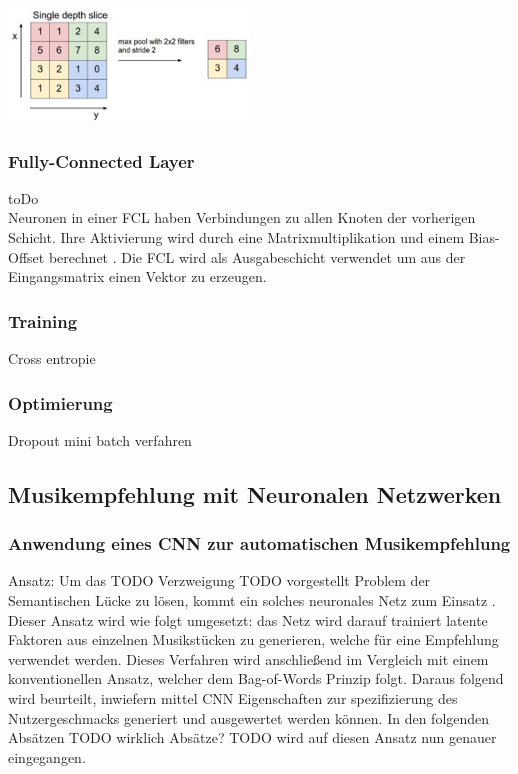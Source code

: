 \documentclass[twosided,a4,10pt]{article}
\begin{document}
\begin{multicols}{2}
		\begin{minipage}{0.4\textwidth}
			\centering
			\includegraphics{img/pooling.png}
			\label{img:pooling}
		\end{minipage}\newline
		
		\subsubsection*{Fully-Connected Layer} toDo\\
		Neuronen in einer FCL haben Verbindungen zu allen Knoten der vorherigen Schicht. Ihre Aktivierung wird durch eine Matrixmultiplikation und einem Bias-Offset berechnet \cite{karpathy}. Die FCL wird als Ausgabeschicht verwendet um aus der Eingangsmatrix einen Vektor zu erzeugen.
		
		\subsubsection{Training}
		Cross entropie
		
		\subsubsection{Optimierung}
		Dropout
		mini batch verfahren
		\subsection{Musikempfehlung mit Neuronalen Netzwerken}
		\subsubsection*{Anwendung eines CNN zur automatischen Musikempfehlung}
		
		Ansatz:
		Um das TODO Verzweigung TODO vorgestellt Problem der Semantischen Lücke zu lösen, kommt ein solches neuronales Netz zum Einsatz \cite{oord}. Dieser Ansatz wird wie folgt umgesetzt: das Netz wird darauf trainiert latente Faktoren aus einzelnen Musikstücken zu generieren, welche für eine Empfehlung verwendet werden. Dieses Verfahren wird anschließend im Vergleich mit einem konventionellen Ansatz, welcher dem Bag-of-Words Prinzip folgt. Daraus folgend wird beurteilt, inwiefern mittel CNN Eigenschaften zur spezifizierung des Nutzergeschmacks generiert und ausgewertet werden können.  In den folgenden Absätzen TODO wirklich Absätze? TODO wird auf diesen Ansatz nun genauer eingegangen.
		

\end{multicols}
\end{document}
